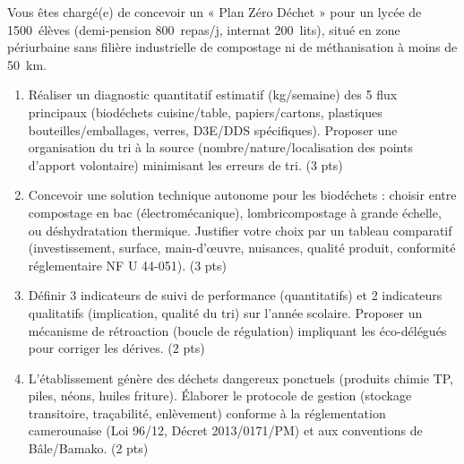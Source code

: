 \documentclass[11pt]{article}
\begin{document}
\begin{exercice}
Vous êtes chargé(e) de concevoir un « Plan Zéro Déchet » pour un lycée de \SI{1500}{élèves} (demi-pension \SI{800}{repas/j}, internat \SI{200}{lits}), situé en zone périurbaine sans filière industrielle de compostage ni de méthanisation à moins de \SI{50}{km}.
\begin{enumerate}
    \item Réaliser un diagnostic quantitatif estimatif (kg/semaine) des 5 flux principaux (biodéchets cuisine/table, papiers/cartons, plastiques bouteilles/emballages, verres, D3E/DDS spécifiques). Proposer une organisation du tri à la source (nombre/nature/localisation des points d'apport volontaire) minimisant les erreurs de tri. (3 pts)
    \item Concevoir une solution technique autonome pour les biodéchets : choisir entre compostage en bac (électromécanique), lombricompostage à grande échelle, ou déshydratation thermique. Justifier votre choix par un tableau comparatif (investissement, surface, main-d'œuvre, nuisances, qualité produit, conformité réglementaire NF U 44-051). (3 pts)
    \item Définir 3 indicateurs de suivi de performance (quantitatifs) et 2 indicateurs qualitatifs (implication, qualité du tri) sur l'année scolaire. Proposer un mécanisme de rétroaction (boucle de régulation) impliquant les éco-délégués pour corriger les dérives. (2 pts)
    \item L'établissement génère des déchets dangereux ponctuels (produits chimie TP, piles, néons, huiles friture). Élaborer le protocole de gestion (stockage transitoire, traçabilité, enlèvement) conforme à la réglementation camerounaise (Loi 96/12, Décret 2013/0171/PM) et aux conventions de Bâle/Bamako. (2 pts)
\end{enumerate}
\end{exercice}
\end{document}
